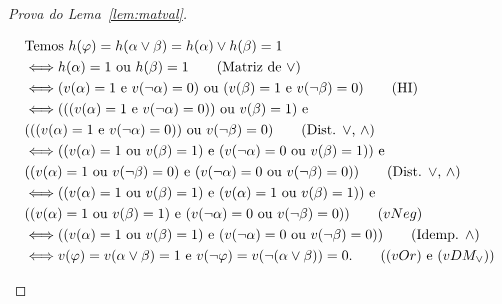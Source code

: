 \begin{proof}[Prova do Lema~\ref{lem:matval}]
\begin{provaporcasos}
            \begin{provaporsubcasos}
                \begin{align*}
                    &\textnormal{Temos }h(\phi) = h(\alpha \lor \beta) = h(\alpha) \lor h(\beta) = 1\\
                    &\Longleftrightarrow h(\alpha) = 1\textnormal{ ou }h(\beta) = 1\tag*{(Matriz de $\lor$)}\\
                    &\Longleftrightarrow (v(\alpha) = 1 \text{ e } v(\neg \alpha) = 0)\textnormal{ ou }(v(\beta) = 1 \textnormal{ e } v(\neg \beta) = 0)\tag*{(HI)}\\
                    &\Longleftrightarrow (((v(\alpha) = 1 \text{ e } v(\neg \alpha) = 0))\text{ ou }v(\beta) = 1) \text{ e }\\&(((v(\alpha) = 1 \text{ e } v(\neg \alpha) = 0))\text{ ou }v(\neg\beta) = 0)\tag*{(Dist. $\lor$, $\land$)}\\
                    &\Longleftrightarrow ((v(\alpha) = 1 \textnormal{ ou } v(\beta) = 1) \text{ e } (v(\neg \alpha) = 0 \text{ ou } v(\beta) = 1)) \text{ e }\\&((v(\alpha) = 1 \textnormal{ ou } v(\neg \beta) = 0) \text{ e } (v(\neg \alpha) = 0 \text{ ou } v(\neg \beta) = 0))\tag*{(Dist. $\lor$, $\land$)}\\
                    &\Longleftrightarrow ((v(\alpha) = 1 \textnormal{ ou } v(\beta) = 1) \text{ e } (v(\alpha) = 1 \text{ ou } v(\beta) = 1)) \text{ e }\\&((v(\alpha) = 1 \textnormal{ ou } v(\beta) = 1) \text{ e } (v(\neg \alpha) = 0 \text{ ou } v(\neg \beta) = 0))\tag*{$(vNeg)$}\\
                    &\Longleftrightarrow ((v(\alpha) = 1 \textnormal{ ou } v(\beta) = 1) \text{ e } (v(\neg \alpha) = 0 \text{ ou } v(\neg \beta) = 0))\tag*{(Idemp. $\land$)}\\
                    &\Longleftrightarrow v(\phi) = v(\alpha \lor \beta) = 1\textnormal{ e }v(\neg \phi) = v(\neg(\alpha \lor \beta)) = 0.\tag*{($(vOr)$ e $(vDM_{\lor})$)}
                \end{align*}
                    

\end{provaporsubcasos}
\end{provaporcasos}
\end{proof}
